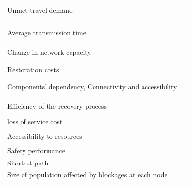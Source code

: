 \documentclass[11pt,twoside]{article}
\numberwithin{equation}{section}
\newcommand{\?}{\stackrel{?}{=}}
\begin{document}
\begin{table}[h!]
\begin{center}
\begin{tabular}{p{2in} p{3.5in}}
      Unmet travel demand & \citep{ahmed2020resilience}\\
      & \citep{jenelius2006importance}\\
      & \citep{bhatia2015network}\\
      & \citep{kermanshah2017robustness}\\
      & \citep{tingting2020transportation} \\ \hline
      Average transmission time & \citep{ahmed2020resilience}\\
      & \citep{wu2020traffic}\\
      & \citep{tingting2020transportation}\\
      & \citep{jenelius2006importance}\\ \hline
      Change in network capacity  & \citep{wu2020traffic}\\
      & \citep{ahmed2020resilience}\\
      & \citep{jenelius2006importance} \\ \hline
      Restoration costs & \citep{aydin2018framework}\\
      & \citep{ahmed2020resilience}\\
      & \citep{baroud2014inherent} \\ \hline
      Components' dependency, Connectivity and accessibility & \citep{ahmed2020resilience}\\
      & \citep{bhatia2015network}\\
      & \citep{jenelius2006importance}\\
      & \citep{mattsson2015vulnerability} \\ \hline
      Efficiency of the recovery process & \citep{aydin2018framework}\\
      & \citep{zhang2017resiliencebased} \\ \hline
      loss of service cost & \citep{fang2016resiliencebased}\\
      & \citep{baroud2014inherent}\\ \hline
       Accessibility to resources & \citep{aydin2018framework}\\
      & \citep{ahmed2020resilience}\\ \hline
      Safety performance & \citep{ahmed2020resilience}\\ \hline
      Shortest path & \citep{ahmed2020resilience}\\ \hline
      Size of population affected by blockages at each node & \citep{aydin2018framework}\\ \hline

\end{tabular}
\end{center}
\end{table}
\end{document}
